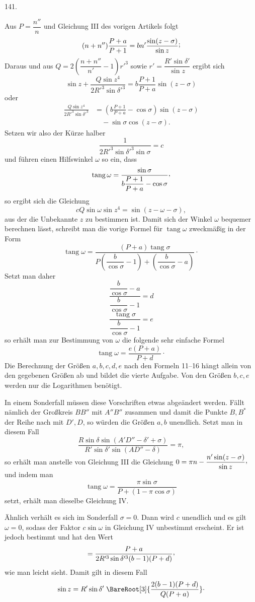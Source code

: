 \par{}\medskip
\begin{center}\hypertarget{native-189-article141}{}141.\end{center}
Aus $P=\dfrac{n''}{n}$ und Gleichung III des vorigen Artikels folgt
\[
(n+n'')\frac{P+a}{P+1}=bn'\frac{\sin(z-\sigma)}{\sin z}\mathpunct{\raisebox{.45ex}{;}}
\]
Daraus und aus $Q=2\left(\dfrac{n+n''}{n'}-1\right)r'^3$ sowie $r'=\dfrac{R'\sin\delta'}{\sin z}$ ergibt sich
\[
\sin z+\frac{Q\sin z^4}{2R'^3\sin\delta'^3}=b\frac{P+1}{P+a}\sin(z-\sigma)
\]
oder
\[
\begin{aligned}
\frac{Q\sin z^4}{2R'^3\sin\delta'^3}&=\left(b\frac{P+1}{P+a}-\cos\sigma\right)\sin(z-\sigma)\\[.5ex]
&\quad-\sin\sigma\cos(z-\sigma).
\end{aligned}
\]
Setzen wir also der Kürze halber
\[
\tag*{14)}\frac{1}{2R'^3\sin\delta'^3\sin\sigma}=c
\]
und führen einen Hilfswinkel $\omega$ so ein, dass
\[
\operatorname{tang}\omega=\frac{\sin\sigma}{b\dfrac{P+1}{P+a}-\cos\sigma}\mathpunct{\raisebox{.45ex}{,}}
\]
so ergibt sich die Gleichung
\[
\tag*{IV.}cQ\sin\omega\sin z^4=\sin(z-\omega-\sigma),
\]
aus der die Unbekannte $z$ zu bestimmen ist. Damit sich der Winkel $\omega$ bequemer berechnen lässt, schreibt man die vorige Formel für $\operatorname{tang}\omega$ zweckmäßig in der Form
\[
\operatorname{tang}\omega=\frac{(P+a)\operatorname{tang}\sigma}{P\left(\dfrac{b}{\cos\sigma}-1\right)+\left(\dfrac{b}{\cos\sigma}-a\right)}\mathpunct{\cdot}
\]
Setzt man daher
\[
\tag*{15)}\frac{\dfrac{b}{\cos\sigma}-a}{\dfrac{b}{\cos\sigma}-1}=d
\]
\[
\tag*{16)}\frac{\operatorname{tang}\sigma}{\dfrac{b}{\cos\sigma}-1}=e
\]
so erhält man zur Bestimmung von $\omega$ die folgende sehr einfache Formel
\[
\operatorname{tang}\omega=\frac{e(P+a)}{P+d}\mathpunct{\cdot}
\]
Die Berechnung der Größen $a,b,c,d,e$ nach den Formeln 11–16 hängt allein von den gegebenen Größen ab und bildet die vierte Aufgabe. Von den Größen $b,c,e$ werden nur die Logarithmen benötigt.

In einem Sonderfall müssen diese Vorschriften etwas abgeändert werden. Fällt nämlich der Großkreis $BB''$ mit $A''B''$ zusammen und damit die Punkte $B,B^\ast$ der Reihe nach mit $D',D$, so würden die Größen $a,b$ unendlich. Setzt man in diesem Fall
\[
\frac{R\sin\delta\sin(A'D''-\delta'+\sigma)}{R'\sin\delta'\sin(AD''-\delta)}=\pi,
\]
so erhält man anstelle von Gleichung III die Gleichung $0=\pi n-\dfrac{n'\sin(z-\sigma)}{\sin z}\mathpunct{\raisebox{.45ex}{,}}$ und indem man
\[
\operatorname{tang}\omega=\frac{\pi\sin\sigma}{P+(1-\pi\cos\sigma)}
\]
setzt, erhält man dieselbe Gleichung IV.

Ähnlich verhält es sich im Sonderfall $\sigma=0$. Dann wird $c$ unendlich und es gilt $\omega=0$, sodass der Faktor $c\sin\omega$ in Gleichung IV unbestimmt erscheint. Er ist jedoch bestimmt und hat den Wert
\[
=\frac{P+a}{2R'^3\sin\delta'^3(b-1)(P+d)}\mathpunct{\raisebox{.45ex}{,}}
\]
wie man leicht sieht. Damit gilt in diesem Fall
\[
\sin z=R'\sin\delta'\;\BareRoot[3]{\frac{2(b-1)(P+d)}{Q(P+a)}}\mathpunct{\cdot}
\]
